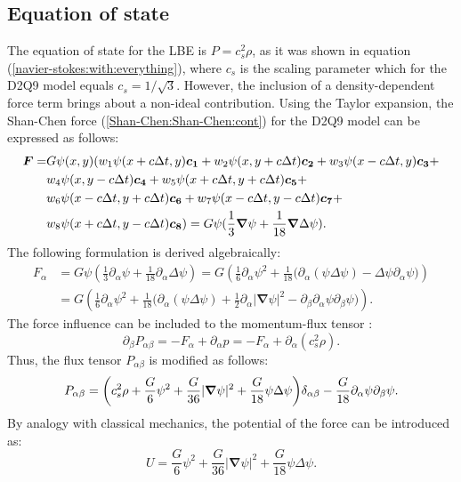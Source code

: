 \documentclass[mathpazo,sort,numbers]{cicp}
\begin{document}
\subsection{Equation of state}
The equation of state for the LBE \cite{Succi-book} is $P=c_s^2\rho$, as it was shown in equation (\ref{navier-stokes:with:everything}), where $c_s$ is the scaling parameter which for the D2Q9 model equals $c_s=1/\sqrt{3}$. However, the inclusion of a density-dependent force term brings about a non-ideal contribution.
Using the Taylor expansion, the Shan-Chen force (\ref{Shan-Chen:Shan-Chen:cont}) for the D2Q9 model can be expressed as follows:
\begin{equation}
\begin{aligned}
\bm{F}=&G\psi(x,y)(w_1 \psi(x+c\Delta t,y)\bm{c_{1}}+w_2 \psi(x,y+c\Delta t)\bm{c_{2}}%
+w_3 \psi(x-c\Delta t,y)\bm{c_{3}}+ \\
&w_4 \psi(x,y-c\Delta t)\bm{c_{4}}+w_5 \psi(x+c\Delta t,y+c\Delta t)\bm{c_{5}}+ \\
&w_6 \psi(x-c\Delta t,y+c\Delta t)\bm{c_{6}}+w_7 \psi(x-c\Delta t,y-c\Delta t)\bm{%
c_{7}}+ \\
&w_8 \psi(x+c\Delta t,y-c\Delta t)\bm{c_{8}})=G\psi(\frac{1}{3}\bm{\nabla}\psi+%
\frac{1}{18}\bm{\nabla}\Delta\psi).
\end{aligned}
\end{equation}
The following formulation is derived algebraically:
\begin{equation}
\label{shan-chen:force:taylor:expansion}
\begin{aligned}
F_{\alpha}&=G\psi\left(\frac{1}{3}\partial_{\alpha}\psi+\frac{1}{18}\partial_{\alpha}\Delta%
\psi\right) =G\left(\frac{1}{6}\partial_{\alpha}\psi^2+\frac{1}{18}%
\biggl(\partial_{\alpha}(\psi\Delta\psi)-\Delta\psi\partial_{\alpha}\psi\biggr)\right) \\
&=G\left(\frac{1}{6}\partial_{\alpha}\psi^2+\frac{1}{18}%
\biggl(\partial_{\alpha}(\psi\Delta\psi)+\frac{1}{2}\partial_{\alpha}|\bm{\nabla}\psi|^2
-\partial_{\beta}\partial_{\alpha}\psi\partial_{\beta}\psi\biggr)\right).
\end{aligned}
\end{equation}
The force influence can be included to the momentum-flux tensor \cite{Sbragaglia-Succi}:
\begin{equation*}
\partial_{\beta}P_{\alpha\beta}=-F_{\alpha}+\partial_{\alpha}p=-F_{\alpha}+\partial_{\alpha}(c_s^2%
\rho).
\end{equation*}
Thus, the flux tensor $P_{\alpha\beta}$ is modified as follows:
\begin{equation*}
P_{\alpha\beta}=\biggl(c_s^2\rho+\frac{G}{6}\psi^2+\frac{G}{36}%
|\bm{\nabla}\psi|^2 +\frac{G}{18}\psi\Delta\psi\biggr)\delta_{\alpha\beta}-\frac{G}{%
18}\partial_{\alpha}\psi\partial_{\beta}\psi.
\end{equation*}
By analogy with classical mechanics, the potential of the force can be introduced as:
\begin{equation}
\label{force:potential}
U=\frac{G}{6}\psi^2+\frac{G}{36}|\bm{\nabla}\psi|^2+\frac{G}{18}%
\psi\Delta\psi.
\end{equation}
\end{document}
